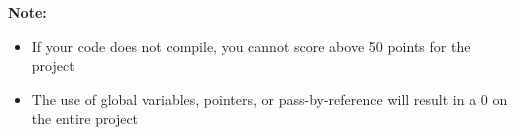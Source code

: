 \textbf{Note:}
\begin{itemize}
    \item If your code does not compile, you cannot score above 50 points for the project
    \item The use of global variables, pointers, or pass-by-reference will result in a 0 on the entire project
\end{itemize}